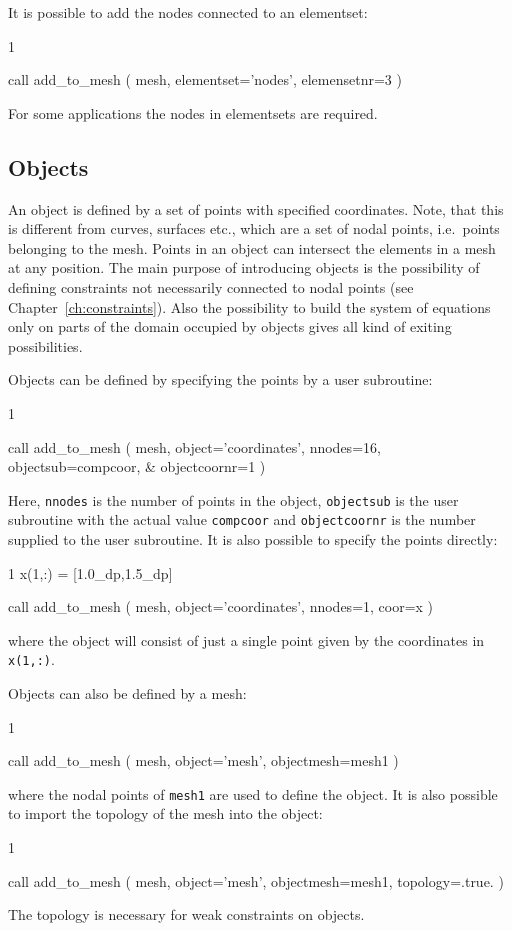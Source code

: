 It is possible to add the nodes connected to an elementset:
\begin{listing}{1}

  call add_to_mesh ( mesh, elementset='nodes', elemensetnr=3 )
   
\end{listing}
For some applications the nodes in elementsets are required.

\subsection{Objects}
\label{sec:objects}

An object is defined by a set of points with specified coordinates. Note, that
this is different from curves, surfaces etc., which are a set of nodal points,
i.e.\ points belonging to the mesh. Points in an object can intersect the
elements in a mesh at any position. The main purpose of introducing objects is
the possibility of defining constraints not necessarily connected to nodal
points (see Chapter~\ref{ch:constraints}). Also the possibility to build the
system of equations only on parts of the domain occupied by objects gives all
kind of exiting possibilities.

Objects can be defined by specifying the points by a user subroutine:
\begin{listing}{1}

  call add_to_mesh ( mesh, object='coordinates', nnodes=16, objectsub=compcoor, &
    objectcoornr=1 )

\end{listing}
Here, \texttt{nnodes} is the number of points in the object, \texttt{objectsub}
is the user subroutine with the actual value \texttt{compcoor} and
\texttt{objectcoornr} is the number supplied to the user subroutine. It is
also possible to specify the points directly:
\begin{listing}{1}
  x(1,:) = [1.0_dp,1.5_dp]
                                                                                
  call add_to_mesh ( mesh, object='coordinates', nnodes=1, coor=x )

\end{listing}
where the object will consist of just a single point given by the coordinates
in \texttt{x(1,:)}.

Objects can also be defined by a mesh:
\begin{listing}{1}

  call add_to_mesh ( mesh, object='mesh', objectmesh=mesh1 )

\end{listing}
where the nodal points of \texttt{mesh1} are used to define the object. It is
also possible to import the topology of the mesh into the object:
\begin{listing}{1}

  call add_to_mesh ( mesh, object='mesh', objectmesh=mesh1, topology=.true. )

\end{listing}
The topology is necessary for weak constraints on objects.

